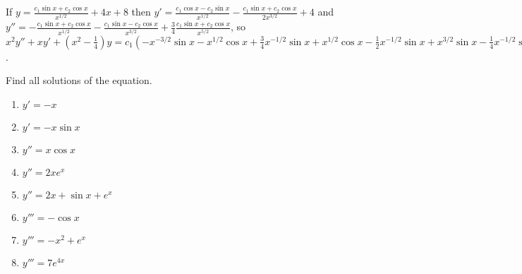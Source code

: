 \documentclass{ximera}
\begin{document}
\begin{problem}
\begin{enumerate}
\begin{expandable}
    If $y=\frac{c_1\sin x+c_2 \cos x}{x^{1/2}}+4x+8$
then
 $y'=\frac{c_1\cos x-c_2 \sin x}{x^{1/2}}
-\frac{c_1\sin x+c_2 \cos x}{2x^{3/2}}+4$ and
$y''=-\frac{c_1\sin x+c_2 \cos x}{x^{1/2}}
-\frac{c_1\sin x-c_2 \cos x}{x^{3/2}}+\frac{3}{4}
\frac{c_1\sin x+c_2 \cos x}{x^{5/2}}$, so
$ x^2y''+xy'+\left(x^2-\frac{1}{4}\right)y=
c_1\left(-x^{-3/2}\sin x-x^{1/2}\cos x+
\frac{3}{4}x^{-1/2}\sin x +x^{1/2}\cos x-
\frac{1}{2}x^{-1/2}\sin x+x^{3/2}\sin
x-\frac{1}{4}x^{-1/2}
\sin x\right)+
 c_2\left(-x^{-3/2}\cos x+x^{1/2}\sin x
+\frac{3}{4}x^{-1/2}\cos x-x^{1/2}\sin x-\frac{1}{2}x^{-1/2}\cos x+
 x^{3/2}\cos x-\frac{1}{4}x^{-1/2}\cos x\right)+4x+\left(x^2-\frac{1}{4}\right)
(4x+8)=4x^3+8x^2+3x-2$.
\end{expandable}
\end{enumerate}
\end{problem}

\begin{problem}\label{exer:1.2.3}
Find all solutions of the  equation.

\begin{enumerate}
\item $y'=-x$
\item $y'=-x \sin x$
\item $y''=x \cos x$
\item $y''=2xe^x$
\item $y''=2x+\sin x+e^x$
\item $y'''=-\cos x$
\item $y'''=-x^2+e^x$
\item $y'''=7e^{4x}$
\end{enumerate}
\end{problem}
\end{document}

